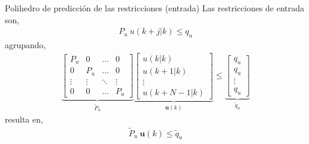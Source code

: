 \documentclass[8pt]{beamer}
\begin{document}
\begin{frame}[fragile]{Polihedro de predicción de las restricciones (entrada)}
	Las restricciones de entrada son,
	\begin{align*}
	P_u~u(k+j|k)\leq q_u
	\end{align*}
	agrupando,
	\begin{equation*}
	\begin{aligned}
	\underbrace{
		\begin{bmatrix}
			P_u    & 0      & \dots  & 0      \\
			0      & P_u    & \dots  & 0      \\
			\vdots & \vdots & \ddots & \vdots \\
			0      & 0      & \dots  & P_u
		\end{bmatrix}
	}_{\tilde{P}_u}
	\underbrace{
		\begin{bmatrix}
			u(k|k)     \\
			u(k+1|k)   \\
			\vdots     \\
			u(k+N-1|k)
		\end{bmatrix}
	}_{\mathbf{u}(k)}
	\leq
	\underbrace{
		\begin{bmatrix}
			q_u    \\
			q_u    \\
			\vdots \\
			q_u
		\end{bmatrix}
	}_{\tilde{q}_u}
	\end{aligned}
	\end{equation*}
	resulta en,
	\begin{align}
	\tilde{P}_u~\mathbf{u}(k)\leq \tilde{q}_u
	\end{align}
	
\end{frame}
\end{document}
